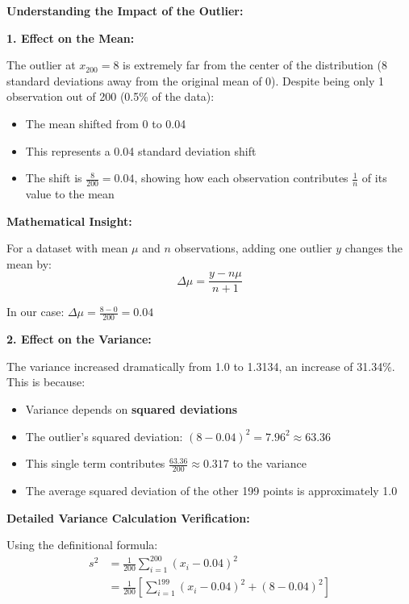 \documentclass[12pt]{article}
\begin{document}
\begin{explanation}
\textbf{Understanding the Impact of the Outlier:}

\textbf{1. Effect on the Mean:}

The outlier at \(x_{200} = 8\) is extremely far from the center of the distribution (8 standard deviations away from the original mean of 0). Despite being only 1 observation out of 200 (0.5\% of the data):

\begin{itemize}
    \item The mean shifted from 0 to 0.04
    \item This represents a 0.04 standard deviation shift
    \item The shift is \(\frac{8}{200} = 0.04\), showing how each observation contributes \(\frac{1}{n}\) of its value to the mean
\end{itemize}

\textbf{Mathematical Insight:}

For a dataset with mean \(\mu\) and \(n\) observations, adding one outlier \(y\) changes the mean by:
\[
\Delta\mu = \frac{y - n\mu}{n+1}
\]

In our case: \(\Delta\mu = \frac{8 - 0}{200} = 0.04\)

\textbf{2. Effect on the Variance:}

The variance increased dramatically from 1.0 to 1.3134, an increase of 31.34\%. This is because:

\begin{itemize}
    \item Variance depends on \textbf{squared deviations}
    \item The outlier's squared deviation: \((8 - 0.04)^2 = 7.96^2 \approx 63.36\)
    \item This single term contributes \(\frac{63.36}{200} \approx 0.317\) to the variance
    \item The average squared deviation of the other 199 points is approximately 1.0
\end{itemize}

\textbf{Detailed Variance Calculation Verification:}

Using the definitional formula:
\begin{align*}
s^2 &= \frac{1}{200}\sum_{i=1}^{200}(x_i - 0.04)^2 \\
&= \frac{1}{200}\left[\sum_{i=1}^{199}(x_i - 0.04)^2 + (8 - 0.04)^2\right]
\end{align*}


\end{explanation}
\end{document}
